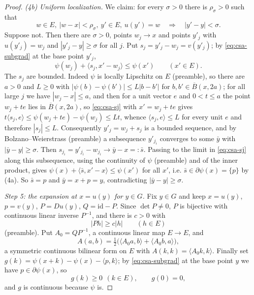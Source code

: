 \begin{proof}
\emph{(4b) Uniform localization.} We claim: for every $\sigma>0$ there is
$\rho_\sigma>0$ such that
\[
  w\in E,\ |w-x|<\rho_\sigma,\ y'\in E,\ u(y')=w
  \quad\Longrightarrow\quad |y'-y|<\sigma .
\]
Suppose not. Then there are $\sigma>0$, points $w_j\to x$ and points $y'_j$ with
$u(y'_j)=w_j$ and $|y'_j-y|\ge\sigma$ for all $j$. Put
$s_j=y'_j-w_j=v(y'_j)$; by \eqref{eq:csa-subgrad} at the base point $y'_j$,
\begin{equation}\label{eq:csa-sj}
  \psi(w_j)+\langle s_j,x'-w_j\rangle\le\psi(x')\qquad(x'\in E).
\end{equation}
The $s_j$ are bounded. Indeed $\psi$ is locally Lipschitz on $E$ (preamble), so
there are $a>0$ and $L\ge0$ with $|\psi(b)-\psi(b')|\le L|b-b'|$ for
$b,b'\in\overline B(x,2a)$; for all large $j$ we have $|w_j-x|\le a$, and then
for a unit vector $e$ and $0<t\le a$ the point $w_j+te$ lies in $\overline
B(x,2a)$, so \eqref{eq:csa-sj} with $x'=w_j+te$ gives
$t\langle s_j,e\rangle\le\psi(w_j+te)-\psi(w_j)\le Lt$, whence
$\langle s_j,e\rangle\le L$ for every unit $e$ and therefore $|s_j|\le L$.
Consequently $y'_j=w_j+s_j$ is a bounded sequence, and by Bolzano--Weierstrass
(preamble) a subsequence $y'_{j_i}$ converges to some $\bar y$ with
$|\bar y-y|\ge\sigma$. Then $s_{j_i}=y'_{j_i}-w_{j_i}\to\bar y-x=:\bar s$.
Passing to the limit in \eqref{eq:csa-sj} along this subsequence, using the
continuity of $\psi$ (preamble) and of the inner product, gives
$\psi(x)+\langle\bar s,x'-x\rangle\le\psi(x')$ for all $x'$, i.e.
$\bar s\in\partial\psi(x)=\{p\}$ by (4a). So $\bar s=p$ and
$\bar y=x+p=y$, contradicting $|\bar y-y|\ge\sigma$.

\emph{Step 5: the expansion at $x=u(y)$ for $y\in G$.}
Fix $y\in G$ and keep $x=u(y)$, $p=v(y)$, $P=Du(y)$, $Q=\mathrm{id}-P$. Since
$\det P\ne0$, $P$ is bijective with continuous linear inverse $P^{-1}$, and
there is $c>0$ with
\begin{equation}\label{eq:csa-lower}
  |Ph|\ge c|h|\qquad(h\in E)
\end{equation}
(preamble). Put $A_0=QP^{-1}$, a continuous linear map $E\to E$, and
\[
  A(a,b)=\tfrac12\bigl(\langle A_0a,b\rangle+\langle A_0b,a\rangle\bigr),
\]
a symmetric continuous bilinear form on $E$ with
$A(k,k)=\langle A_0k,k\rangle$. Finally set
$g(k)=\psi(x+k)-\psi(x)-\langle p,k\rangle$; by \eqref{eq:csa-subgrad} at the
base point $y$ we have $p\in\partial\psi(x)$, so
\begin{equation}\label{eq:csa-gnonneg}
  g(k)\ge0\ \ (k\in E),\qquad g(0)=0,
\end{equation}
and $g$ is continuous because $\psi$ is.


\end{proof}
